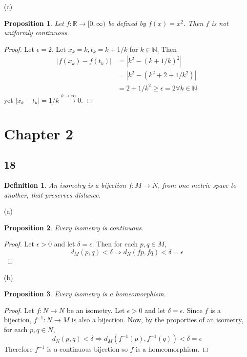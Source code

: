 \documentclass[11pt]{amsart}
\newtheorem*{prop}{Proposition}
\newtheorem*{Def}{Definition}
\begin{document}
(c)
\begin{prop}
	Let $f:\mathbb{R} \longrightarrow [0,\infty)$ be defined by $f(x) = x^{2}$. Then $f$ is not uniformly continuous.
\end{prop}

\begin{proof}
	Let $\epsilon = 2$. Let $x_{k} = k, t_{k} = k + 1/k$ for $k \in \mathbb{N}$. Then 
	\begin{align*}
		|f(x_{k}) - f(t_{k})| & = |k^{2} - (k+1/k)^{2}| \\
		& = |k^{2} - (k^{2} + 2 + 1/k^{2})| \\
		& = 2 + 1/k^{2} \geq \epsilon = 2 \forall k \in \mathbb{N}
	\end{align*}
	yet $|x_{k} - t_{k}| = 1/k \stackrel{k\rightarrow \infty}{\longrightarrow} 0$.
\end{proof}


\section*{Chapter 2}

\subsection*{18} 
\begin{Def}
  An isometry is a bijection $f: M \longrightarrow N$, from one metric space to another, that preserves distance.
\end{Def}

(a) 
\begin{prop}
  Every isometry is continuous.
\end{prop}

\begin{proof}
  Let $\epsilon > 0$ and let $\delta = \epsilon$. Then for each $p,q\in M$, 
  \[ d_{M}(p,q) < \delta \Rightarrow d_{N}(fp, fq) < \delta = \epsilon \]
\end{proof}

(b) 
\begin{prop} 
  Every isometry is a homeomorphism.
\end{prop}

\begin{proof}
  Let $f: N\longrightarrow N$ be an isometry. Let $\epsilon > 0$ and let $\delta = \epsilon$. Since $f$ is a bijection, $f^{-1}: N\longrightarrow M$ is also a bijection. Now, by the proporties of an isometry, for each $p,q \in N$,
  \[ d_{N}(p,q) < \delta \Rightarrow d_{M}(f^{-1}(p), f^{-1}(q)) < \delta = \epsilon \]
  Therefore $f^{-1}$ is a continuous bijection so $f$ is a homeomorphism.
\end{proof}
\end{document}
